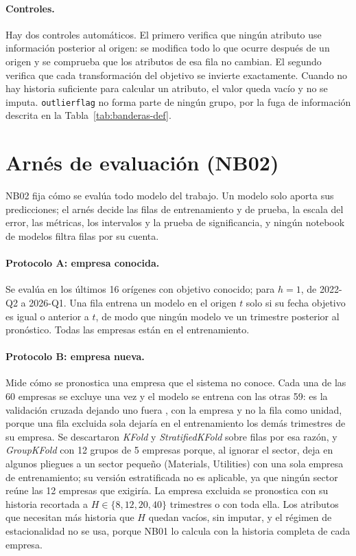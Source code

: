 \documentclass[12pt,letterpaper,oneside]{report}
\renewcommand{\_}{\UnderscoreOriginal\allowbreak}
\begin{document}
\paragraph{Controles.} Hay dos controles automáticos. El primero verifica que ningún atributo use información posterior al origen: se modifica todo lo que ocurre después de un origen y se comprueba que los atributos de esa fila no cambian. El segundo verifica que cada transformación del objetivo se invierte exactamente. Cuando no hay historia suficiente para calcular un atributo, el valor queda vacío y no se imputa. \texttt{outlier\_flag} no forma parte de ningún grupo, por la fuga de información descrita en la Tabla~\ref{tab:banderas-def}.

\section{Arnés de evaluación (NB02)}
\label{sec:arnes}

NB02 fija cómo se evalúa todo modelo del trabajo. Un modelo solo aporta sus predicciones; el arnés decide las filas de entrenamiento y de prueba, la escala del error, las métricas, los intervalos y la prueba de significancia, y ningún notebook de modelos filtra filas por su cuenta.

\paragraph{Protocolo A: empresa conocida.} Se evalúa en los últimos 16 orígenes con objetivo conocido; para $h = 1$, de 2022-Q2 a 2026-Q1. Una fila entrena un modelo en el origen $t$ solo si su fecha objetivo es igual o anterior a $t$, de modo que ningún modelo ve un trimestre posterior al pronóstico. Todas las empresas están en el entrenamiento.

\paragraph{Protocolo B: empresa nueva.} Mide cómo se pronostica una empresa que el sistema no conoce. Cada una de las 60 empresas se excluye una vez y el modelo se entrena con las otras 59: es la validación cruzada dejando uno fuera \parencite{muller2016introduction}, con la empresa y no la fila como unidad, porque una fila excluida sola dejaría en el entrenamiento los demás trimestres de su empresa. Se descartaron \textit{KFold} y \textit{StratifiedKFold} sobre filas por esa razón, y \textit{GroupKFold} con 12 grupos de 5 empresas porque, al ignorar el sector, deja en algunos pliegues a un sector pequeño (Materials, Utilities) con una sola empresa de entrenamiento; su versión estratificada no es aplicable, ya que ningún sector reúne las 12 empresas que exigiría. La empresa excluida se pronostica con su historia recortada a $H \in \{8, 12, 20, 40\}$ trimestres o con toda ella. Los atributos que necesitan más historia que $H$ quedan vacíos, sin imputar, y el régimen de estacionalidad no se usa, porque NB01 lo calcula con la historia completa de cada empresa.
\end{document}

